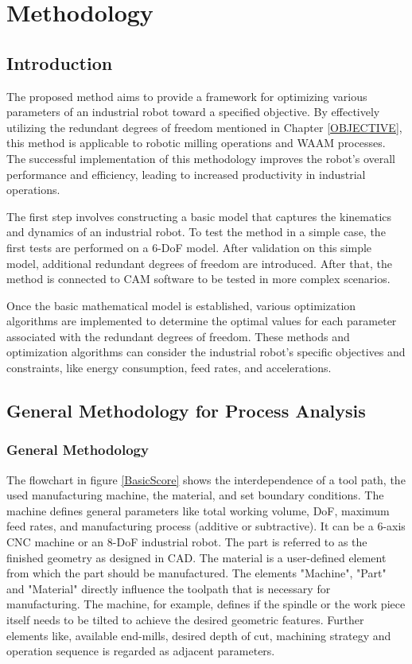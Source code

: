 \chapter{Methodology}%

\section{Introduction}%

The proposed method aims to provide a framework for optimizing various parameters of an industrial robot toward a specified objective. By effectively utilizing the redundant degrees of freedom mentioned in Chapter \ref{OBJECTIVE}, this method is applicable to robotic milling operations and WAAM processes. The successful implementation of this methodology improves the robot's overall performance and efficiency, leading to increased productivity in industrial operations.

The first step involves constructing a basic model that captures the kinematics and dynamics of an industrial robot. To test the method in a simple case, the first tests are performed on a 6-DoF model. After validation on this simple model, additional redundant degrees of freedom are introduced. After that, the method is connected to CAM software to be tested in more complex scenarios.

Once the basic mathematical model is established, various optimization algorithms are implemented to determine the optimal values for each parameter associated with the redundant degrees of freedom. These methods and optimization algorithms can consider the industrial robot's specific objectives and constraints, like energy consumption, feed rates, and accelerations. 


\section{General Methodology for Process Analysis}
\subsection{General Methodology}\label{general}

The flowchart in figure \ref{BasicScore} shows the interdependence of a tool path, the used manufacturing machine, the material, and set boundary conditions. The machine defines general parameters like total working volume, DoF, maximum feed rates, and manufacturing process (additive or subtractive). It can be a 6-axis CNC machine or an 8-DoF industrial robot. The part is referred to as the finished geometry as designed in CAD. The material is a user-defined element from which the part should be manufactured. The elements "Machine", "Part" and "Material" directly influence the toolpath that is necessary for manufacturing. The machine, for example, defines if the spindle or the work piece itself needs to be tilted to achieve the desired geometric features. Further elements like, available end-mills, desired depth of cut, machining strategy and operation sequence is regarded as adjacent parameters. 


